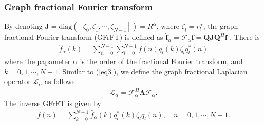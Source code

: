 \documentclass[lettersize,journal]{IEEEtran}
\begin{document}
\subsubsection{Graph fractional Fourier transform} \label{sec2.2.2}
By denoting $\mathbf{J}=\mathrm{diag}\left( \left[\zeta_0, \zeta_1, \cdots, \zeta_{N-1}\right] \right)=R^{\alpha}$, where $\zeta_l=r_l^{\alpha}$, the graph fractional Fourier transform (GFrFT) is defined as $\hat{\mathbf{f}}_{\alpha} = \mathcal{F}_{\alpha}\mathbf{f} = \mathbf{Q} \mathbf{J} \mathbf{Q}^H \mathbf{f}$ \cite{wang2017fractional}. There is \cite{yan2021windowed}
\begin{align}
	\hat{f}_{\alpha}(k) 
	= \sum_{n=0}^{N-1}\sum_{l=0}^{N-1}  f(n) q_l (k) \zeta_l q_l^*(n) 
\end{align}
where the papameter  $\alpha$ is the order of the fractional Fourier transform, and $k=0,1,\cdots,N-1$.
Similar to (\ref{eq3}), we define the graph fractional Laplacian operator $\mathcal{L}_{\alpha}$ as follows
\begin{align}
	\label{eq8}
	\mathcal{L}_{\alpha}=\mathcal{F}_{\alpha}^H \boldsymbol{\Lambda} \mathcal{F}_{\alpha}.
\end{align}
The inverse GFrFT is given by
\begin{align}
	f(n) = \sum_{k=0}^{N-1}\hat{f}_{\alpha}(k) q_l^* (k) \zeta_l q_l(n) , \quad n=0,1,\cdots,N-1.
\end{align}
\end{document}
